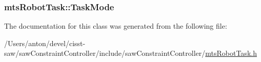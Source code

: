 \subsubsection[{Task\+Mode}]{ mts\+Robot\+Task\+::\+Task\+Mode\hspace{0.3cm}{\ttfamily [protected]}}\label{classmts_robot_task_ac3cc9bd3a27954263574d01325a6439b}


The documentation for this class was generated from the following file\+:\begin{DoxyCompactItemize}
\item 
/\+Users/anton/devel/cisst-\/saw/saw\+Constraint\+Controller/include/saw\+Constraint\+Controller/\hyperlink{mts_robot_task_8h}{mts\+Robot\+Task.\+h}\end{DoxyCompactItemize}
